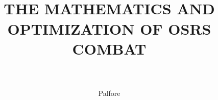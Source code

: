 \documentclass[12pt,a4paper]{article}
\author{Palfore}
\title{
	\HRule{0.5pt}\\
	\LARGE \textbf{\uppercase{The Mathematics and Optimization of OSRS Combat}}\\
	\HRule{2pt}\\
}
\begin{document}
\begin{titlepage}
	\maketitle
	\thispagestyle{empty}
\end{titlepage}
\end{document}
